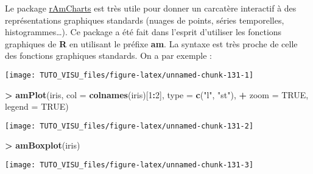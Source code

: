 \documentclass[]{article}
\newenvironment{Shaded}{\begin{snugshade}}{\end{snugshade}}
\newcommand{\DataTypeTok}[1]{\textcolor[rgb]{0.13,0.29,0.53}{#1}}
\newcommand{\DecValTok}[1]{\textcolor[rgb]{0.00,0.00,0.81}{#1}}
\newcommand{\KeywordTok}[1]{\textcolor[rgb]{0.13,0.29,0.53}{\textbf{#1}}}
\newcommand{\NormalTok}[1]{#1}
\newcommand{\OperatorTok}[1]{\textcolor[rgb]{0.81,0.36,0.00}{\textbf{#1}}}
\newcommand{\OtherTok}[1]{\textcolor[rgb]{0.56,0.35,0.01}{#1}}
\newcommand{\StringTok}[1]{\textcolor[rgb]{0.31,0.60,0.02}{#1}}
\theoremstyle{definition}
\theoremstyle{definition}
\theoremstyle{definition}
\theoremstyle{remark}
\begin{document}
Le package \href{https://datastorm-open.github.io/introduction_ramcharts/}{rAmCharts} est très utile pour donner un carcatère interactif à des représentations graphiques standards (nuages de points, séries temporelles, histogrammes\ldots{}). Ce package a été fait dans l'esprit d'utiliser les fonctions graphiques de \textbf{R} en utilisant le préfixe \textbf{am}. La syntaxe est très proche de celle des fonctions graphiques standards. On a par exemple :

\begin{Shaded}
\end{Shaded}

\begin{center}\texttt{[image: TUTO\_VISU\_files/figure-latex/unnamed-chunk-131-1]} \end{center}

\begin{Shaded}
\begin{Highlighting}[]
\OperatorTok{>}\StringTok{ }\KeywordTok{amPlot}\NormalTok{(iris, }\DataTypeTok{col =} \KeywordTok{colnames}\NormalTok{(iris)[}\DecValTok{1}\OperatorTok{:}\DecValTok{2}\NormalTok{], }\DataTypeTok{type =} \KeywordTok{c}\NormalTok{(}\StringTok{"l"}\NormalTok{, }\StringTok{"st"}\NormalTok{), }
\OperatorTok{+}\StringTok{        }\DataTypeTok{zoom =} \OtherTok{TRUE}\NormalTok{, }\DataTypeTok{legend =} \OtherTok{TRUE}\NormalTok{)}
\end{Highlighting}
\end{Shaded}

\begin{center}\texttt{[image: TUTO\_VISU\_files/figure-latex/unnamed-chunk-131-2]} \end{center}

\begin{Shaded}
\begin{Highlighting}[]
\OperatorTok{>}\StringTok{ }\KeywordTok{amBoxplot}\NormalTok{(iris)}
\end{Highlighting}
\end{Shaded}

\begin{center}\texttt{[image: TUTO\_VISU\_files/figure-latex/unnamed-chunk-131-3]} \end{center}
\end{document}
